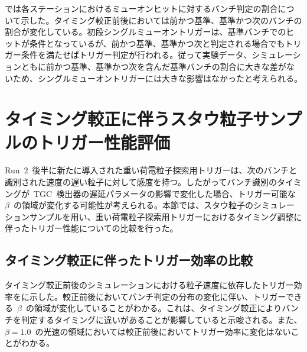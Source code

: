 では各ステーションにおけるミューオンヒットに対するバンチ判定の割合について示した。タイミング較正前後においては前かつ基準、基準かつ次のバンチの割合が変化している。初段シングルミューオントリガーは、基準バンチでのヒットが条件となっているが、前かつ基準、基準かつ次と判定される場合でもトリガー条件を満たせばトリガー判定が行われる。従って実験データ、シミュレーションともに前かつ基準、基準かつ次を含んだ基準バンチの割合に大きな差がないため、シングルミューオントリガーには大きな影響はなかったと考えられる。
\section{タイミング較正に伴うスタウ粒子サンプルのトリガー性能評価}
Run~2~後半に新たに導入された重い荷電粒子探索用トリガーは、次のバンチと識別された速度の遅い粒子に対して感度を持つ。したがってバンチ識別のタイミングが~TGC~検出器の遅延パラメータの影響で変化した場合、トリガー可能な~$\beta$~の領域が変化する可能性が考えられる。本節では、スタウ粒子のシミュレーションサンプルを用い、重い荷電粒子探索用トリガーにおけるタイミング調整に伴ったトリガー性能についての比較を行った。
\subsection{タイミング較正に伴ったトリガー効率の比較}\label{sec:tribeta}
タイミング較正前後のシミュレーションにおける粒子速度に依存したトリガー効率をに示した。較正前後においてバンチ判定の分布の変化に伴い、トリガーできる~$\beta$~の領域が変化していることがわかる。これは、タイミング較正によりバンチを判定するタイミングに違いがあることが影響していると示唆される。また、$\beta=1.0$~の光速の領域においては較正前後においてトリガー効率に変化はないことがわかる。

